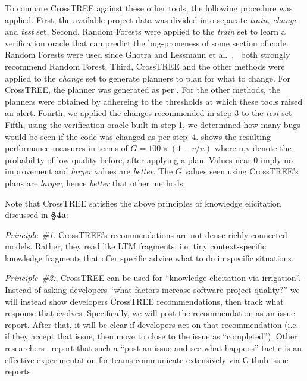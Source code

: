 To compare CrossTREE against these other tools, the following procedure was applied.
First, the available project data was divided into separate {\em train, change} and {\em test} set.
Second, Random Forests were applied to the {\em train} set to learn a verification oracle that can predict the bug-proneness of some section of code.
Random Forests were used since Ghotra and Lessmann et al.~\cite{Gh15},~\cite{Le08} both strongly recommend Random Forest.
Third,  CrossTREE and the other methods were applied to the {\em change} set to generate planners to plan for what to change. For CrossTREE, the planner was generated as per  .
For the other methods, the planners were obtained by adhereing to the thresholds at which these tools raised an alert.
Fourth, we applied the changes recommended in step-3 to the {\em test} set.
Fifth, using the verification oracle built in step-1, we determined how many bugs would be seen if the code was changed as per step~4.
  shows the resulting performance measures in terms of
   $G=100\times(1- v/u)$ where {\emu u,v} denote the probability of low
quality before, after applying a plan. 
Values near 0
imply no improvement and {\em larger} values are {\em better}.
The $G$ values seen using
CrossTREE's plans are {\em larger},  hence {\em better} that other methods. 
  
  
  Note that   CrossTREE  satisfies   the above    principles of knowledge elicitation discussed in {\bf \S{4a}}:
  \bi
  \item
  \mbox{{\em Principle \#1:}}
CrossTREE's recommendations are not dense richly-connected models. Rather, they read
like LTM fragments; i.e. tiny context-specific knowledge fragments that offer specific advice what to do in specific situations. 
\item
\mbox{{\em Principle \#2:}}, CrossTREE can be used for ``knowledge elicitation via irrigation''.
 Instead of asking developers ``what factors increase software project quality?'' we will
 instead show developers  CrossTREE recommendations, then track what response that evolves. 
Specifically, we will post the recommendation as an issue report. After that,
 it will be clear if developers act
 on that recommendation 
 (i.e. if they accept that issue, then move to close to the issue as ``completed'').
Other researchers~\cite{theisen2017risk} report that such a ``post an issue and see what happens'' tactic is an effective experimentation  for  teams communicate extensively via Github issue reports.  
\ei 


